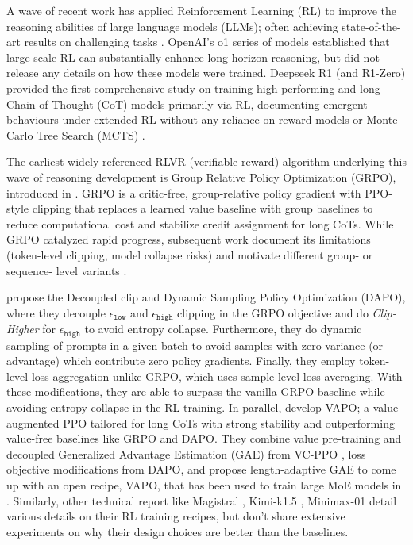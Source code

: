 \documentclass[]{fairmeta} %
\def\eps{{\epsilon}}
\begin{document}
A wave of recent work has applied Reinforcement Learning (RL) to improve the reasoning abilities of large language models (LLMs); often achieving state-of-the-art results on challenging tasks \citep{openai-o1, guo2025deepseek, seed2025seed1, carbonneaux2025cwm}. OpenAI's o1 series of models established that large-scale RL can substantially enhance long-horizon reasoning, but did not release any details on how these models were trained. Deepseek R1 (and R1-Zero) \citep{guo2025deepseek} provided the first comprehensive study on training high-performing and long Chain-of-Thought (CoT) models primarily via RL, documenting emergent behaviours under extended RL without any reliance on reward models \citep{lightman2023let} or Monte Carlo Tree Search (MCTS) \citep{xie2024monte}.

The earliest widely referenced RLVR (verifiable-reward) algorithm underlying this wave of reasoning development is Group Relative Policy Optimization (GRPO), introduced in \citet{shao2024deepseekmath}. GRPO is a critic-free, group-relative policy gradient with PPO-style clipping that replaces a learned value baseline with group baselines to reduce computational cost and stabilize credit assignment for long CoTs. While GRPO catalyzed rapid progress, subsequent work document its limitations (token-level clipping, model collapse risks) and motivate different group- or sequence- level variants \citep{yu2025dapo, yue2025vapo, hu2025open, gspo}.

\citet{yu2025dapo} propose the Decoupled clip and Dynamic Sampling Policy Optimization (DAPO), where they decouple $\eps_{\texttt{low}}$ and $\eps_{\texttt{high}}$ clipping in the GRPO objective and do \textit{Clip-Higher} for $\eps_{\texttt{high}}$ to avoid entropy collapse. Furthermore, they do dynamic sampling of prompts in a given batch to avoid samples with zero variance (or advantage) which contribute zero policy gradients. Finally, they employ token-level loss aggregation unlike GRPO, which uses sample-level loss averaging. With these modifications, they are able to surpass the vanilla GRPO baseline while avoiding entropy collapse in the RL training. In parallel, \citet{yue2025vapo} develop VAPO; a value-augmented PPO tailored for long CoTs with strong stability and outperforming value-free baselines like GRPO and DAPO. They combine value pre-training and decoupled Generalized Advantage Estimation (GAE) from VC-PPO \citep{yuan2025s}, loss objective modifications from DAPO, and propose length-adaptive GAE to come up with an open recipe, VAPO, that has been used to train large MoE models in \citet{seed2025seed1}. Similarly, other technical report like Magistral \citep{rastogi2025magistral}, Kimi-k1.5 \citep{team2025kimi}, Minimax-01 \citep{li2025minimax} detail various details on their RL training recipes, but don't share extensive experiments on why their design choices are better than the baselines.
\end{document}
